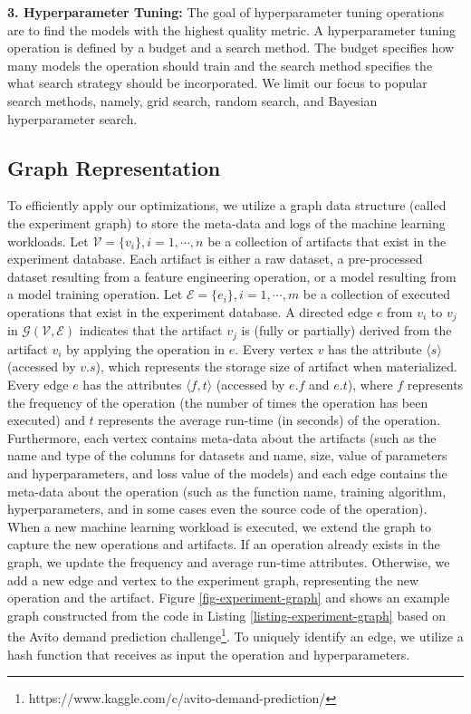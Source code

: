 \textbf{3. Hyperparameter Tuning:}
The goal of hyperparameter tuning operations are to find the models with the highest quality metric.
A hyperparameter tuning operation is defined by a budget and a search method.
The budget specifies how many models the operation should train and the search method specifies the what search strategy should be incorporated.
We limit our focus to popular search methods, namely, grid search, random search, and Bayesian hyperparameter search.

\subsection{Graph Representation}\label{sub-graph-construction}
To efficiently apply our optimizations, we utilize a graph data structure (called the experiment graph) to store the meta-data and logs of the machine learning workloads.
Let $\mathcal{V}=\{v_i\}, i = 1, \cdots, n$ be a collection of artifacts that exist in the experiment database.
Each artifact is either a raw dataset, a pre-processed dataset resulting from a feature engineering operation, or a model resulting from a model training operation.
Let $\mathcal{E}=\{e_i\}, i = 1, \cdots, m$ be a collection of executed operations that exist in the experiment database.
A directed edge $e$ from $v_i$ to $v_j$ in $\mathcal{G}(\mathcal{V},\mathcal{E})$ indicates that the artifact $v_j$ is (fully or partially) derived from the artifact $v_i$ by applying the operation in $e$.
Every vertex $v$ has the attribute $\langle s \rangle$ (accessed by $v.s$), which represents the storage size of artifact when materialized.
Every edge $e$ has the attributes $\langle f, t\rangle$ (accessed by $e.f$ and $e.t$), where $f$ represents the frequency of the operation (the number of times the operation has been executed) and $t$ represents the average run-time (in seconds) of the operation.
Furthermore, each vertex contains meta-data about the artifacts (such as the name and type of the columns for datasets and name, size, value of parameters and hyperparameters, and loss value of the models) and each edge contains the meta-data about the operation (such as the function name, training algorithm, hyperparameters, and in some cases even the source code of the operation).
When a new machine learning workload is executed, we extend the graph to capture the new operations and artifacts.
If an operation already exists in the graph, we update the frequency and average run-time attributes.
Otherwise, we add a new edge and vertex to the experiment graph, representing the new operation and the artifact.
Figure \ref{fig-experiment-graph} and  shows an example graph constructed from the code in Listing \ref{listing-experiment-graph} based on the Avito demand prediction challenge\footnote{https://www.kaggle.com/c/avito-demand-prediction/}.
To uniquely identify an edge, we utilize a hash function that receives as input the operation and hyperparameters.

